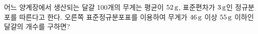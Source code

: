 \noindent\begin{minipage}[t]{0.58\linewidth}\vspace{0pt}\raggedright 어느 양계장에서 생산되는 달걀 100개의 무게는 평균이 $52\mkern3mu \mathrm{g}$, 표준편차가 $3\mkern3mu \mathrm{g}$인 정규분포를 따른다고 한다. 오른쪽 표준정규분포표를 이용하여 무게가 $46\mkern3mu \mathrm{g}$ 이상 $55\mkern3mu \mathrm{g}$ 이하인 달걀의 개수를 구하면?\end{minipage}\hfill\begin{minipage}[t]{0.4\linewidth}\vspace{0pt}\centering \resizebox{\ifdim\width>\linewidth\linewidth\else\width\fi}{!}{}\end{minipage}\par
{}
